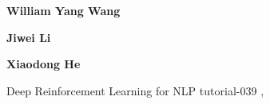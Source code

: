 \begin{bio}
\small
{\bfseries William Yang Wang} 

{\bfseries Jiwei Li}

{\bfseries Xiaodong He}

\end{bio}

\begin{tutorial}{Deep Reinforcement Learning for NLP}
  {tutorial-039}
  {\daydateyear, \tutorialafternoontime}
  {\TutLocG}

\end{tutorial}
